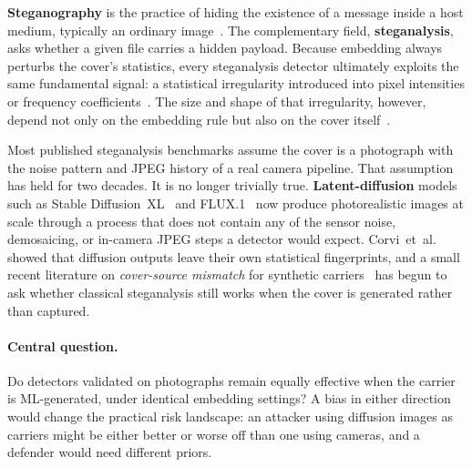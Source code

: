 \documentclass[10pt,twocolumn,a4paper]{article}
\begin{document}
\textbf{Steganography} is the practice of hiding the existence of a message inside a host medium, typically an ordinary image~\cite{petitcolas1999,cheddad2010}. The complementary field, \textbf{steganalysis}, asks whether a given file carries a hidden payload. Because embedding always perturbs the cover's statistics, every steganalysis detector ultimately exploits the same fundamental signal: a statistical irregularity introduced into pixel intensities or frequency coefficients~\cite{westfeld1999chi,fridrich2001lsb,dumitrescu2003sp}. The size and shape of that irregularity, however, depend not only on the embedding rule but also on the cover itself~\cite{giboulot2020csm,mallet2024csm}.

Most published steganalysis benchmarks assume the cover is a photograph with the noise pattern and JPEG history of a real camera pipeline. That assumption has held for two decades. It is no longer trivially true. \textbf{Latent-diffusion} models such as Stable Diffusion~XL~\cite{sdxl2023} and FLUX.1~\cite{flux2024} now produce photorealistic images at scale through a process that does not contain any of the sensor noise, demosaicing, or in-camera JPEG steps a detector would expect. Corvi~et~al.~\cite{corvi2023diffusion} showed that diffusion outputs leave their own statistical fingerprints, and a small recent literature on \emph{cover-source mismatch} for synthetic carriers~\cite{mereur2024deepfake,mallet2024csm} has begun to ask whether classical steganalysis still works when the cover is generated rather than captured.

\paragraph{Central question.} Do detectors validated on photographs remain equally effective when the carrier is ML-generated, under identical embedding settings? A bias in either direction would change the practical risk landscape: an attacker using diffusion images as carriers might be either better or worse off than one using cameras, and a defender would need different priors.
\end{document}
